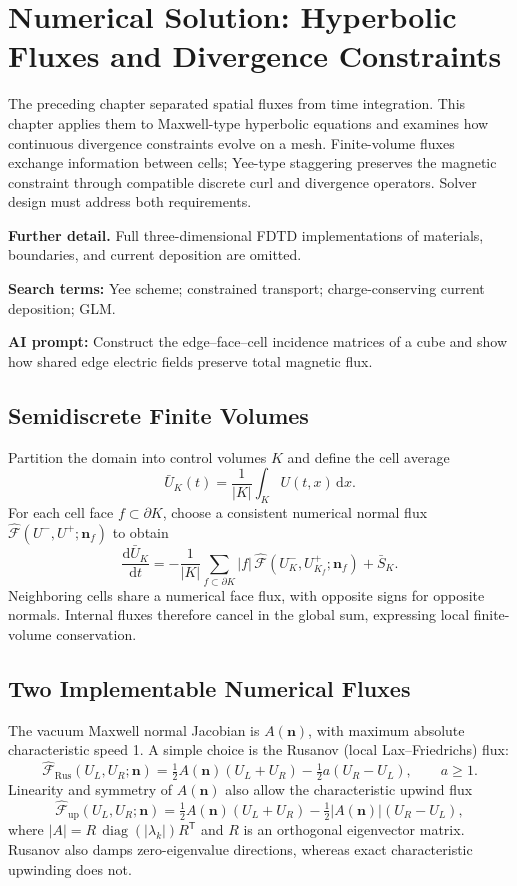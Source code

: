 \documentclass[11pt,openany]{book}
\numberwithin{equation}{chapter}
\theoremstyle{definition}
\theoremstyle{remark}
\newcommand{\dd}{\mathrm d}
\newcommand{\abs}[1]{\left\lvert #1\right\rvert}
\newcommand{\studyroute}[3]{%
  \par\smallskip\noindent\textbf{Further detail.} #1\par
  \begingroup\raggedright\noindent\textbf{Search terms:} #2.\par\endgroup
  \noindent\textbf{AI prompt:} #3\par
}
\begin{document}
\chapter{Numerical Solution: Hyperbolic Fluxes and Divergence Constraints}
\label{ch:numerics}
\begin{chaptersummary}
The preceding chapter separated spatial fluxes from time integration. This chapter applies them to Maxwell-type hyperbolic equations and examines how continuous divergence constraints evolve on a mesh. Finite-volume fluxes exchange information between cells; Yee-type staggering preserves the magnetic constraint through compatible discrete curl and divergence operators. Solver design must address both requirements.
\end{chaptersummary}
\studyroute{Full three-dimensional FDTD implementations of materials, boundaries, and current deposition are omitted.}{Yee scheme; constrained transport; charge-conserving current deposition; GLM}{Construct the edge--face--cell incidence matrices of a cube and show how shared edge electric fields preserve total magnetic flux.}
\section{Semidiscrete Finite Volumes}
Partition the domain into control volumes $K$ and define the cell average
\begin{equation}
\bar U_K(t)=\frac1{|K|}\int_K U(t,x)\,\dd x.
\end{equation}
For each cell face $f\subset\partial K$, choose a consistent numerical normal flux $\widehat{\mathcal F}(U^-,U^+;\bm n_f)$ to obtain
\begin{equation}\label{eq:semidiscrete}
\frac{\dd\bar U_K}{\dd t}=
-\frac1{|K|}\sum_{f\subset\partial K}|f|\,
\widehat{\mathcal F}(U_K^-,U_{K_f}^+;\bm n_f)+\bar S_K.
\end{equation}
Neighboring cells share a numerical face flux, with opposite signs for opposite normals.
Internal fluxes therefore cancel in the global sum, expressing local finite-volume conservation.

\section{Two Implementable Numerical Fluxes}
The vacuum Maxwell normal Jacobian is $A(\bm n)$, with maximum absolute characteristic speed 1.
A simple choice is the Rusanov (local Lax--Friedrichs) flux:
\begin{equation}\label{eq:rusanov}
\widehat{\mathcal F}_{\mathrm{Rus}}(U_L,U_R;\bm n)
=\tfrac12 A(\bm n)(U_L+U_R)-\tfrac12 a(U_R-U_L),\qquad a\geq1.
\end{equation}
Linearity and symmetry of $A(\bm n)$ also allow the characteristic upwind flux
\begin{equation}\label{eq:upwind}
\widehat{\mathcal F}_{\mathrm{up}}(U_L,U_R;\bm n)
=\tfrac12 A(\bm n)(U_L+U_R)
-\tfrac12\abs{A(\bm n)}(U_R-U_L),
\end{equation}
where $\abs A=R\,\operatorname{diag}(|\lambda_k|)R^\mathsf T$ and $R$ is an orthogonal eigenvector matrix.
Rusanov also damps zero-eigenvalue directions, whereas exact characteristic upwinding does not.
\end{document}
